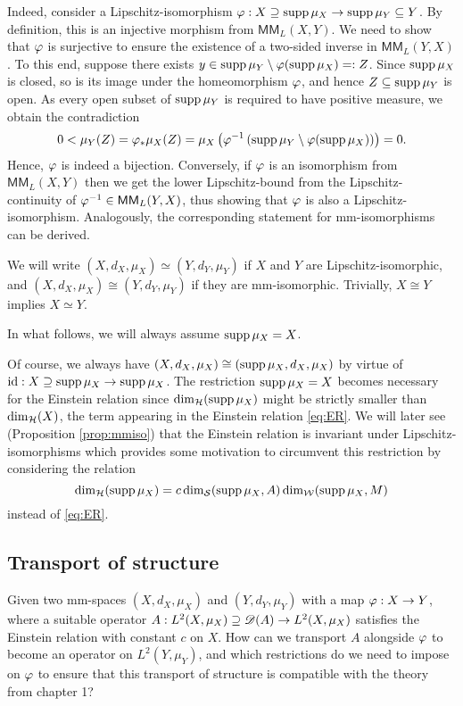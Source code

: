 Indeed, consider a Lipschitz-isomorphism $\varphi:X\supseteq\operatorname{supp}\mu_X\to\operatorname{supp}\mu_Y\subseteq Y$. By definition, this is an injective morphism from $\mathsf{MM}_L(X,Y)$. We need to show that $\varphi$ is surjective to ensure the existence of a two-sided inverse in $\mathsf{MM}_L(Y,X)$. To this end, suppose there exists $y\in\operatorname{supp}\mu_Y\setminus \varphi(\operatorname{supp}\mu_X)=:Z$. Since $\operatorname{supp}\mu_X$ is closed, so is its image under the homeomorphism $\varphi$, and hence $Z\subseteq \operatorname{supp}\mu_Y$ is open. As every open subset of $\operatorname{supp}\mu_Y$ is required to have positive measure, we obtain the contradiction
\[
  0<\mu_Y(Z)=\varphi_*\mu_X(Z)=\mu_X\left(\varphi^{-1}\left(\operatorname{supp}\mu_Y\setminus \varphi(\operatorname{supp}\mu_X)\right)\right)=0.
\]
Hence, $\varphi$ is indeed a bijection. Conversely, if $\varphi$ is an isomorphism from $\mathsf{MM}_L(X,Y)$ then we get the lower Lipschitz-bound from the Lipschitz-continuity of $\varphi^{-1}\in\mathsf{MM}_L(Y,X)$, thus showing that $\varphi$ is also a Lipschitz-isomorphism. Analogously, the corresponding statement for mm-isomorphisms can be derived.

We will write $(X,d_X,\mu_X)\simeq (Y,d_Y,\mu_Y)$ if $X$ and $Y$ are Lipschitz-isomorphic, and 
$(X,d_X,\mu_X)\cong (Y,d_Y,\mu_Y)$ if they are mm-isomorphic. Trivially, $X\cong Y$ implies $X\simeq Y$. 

In what follows, we will always assume $\operatorname{supp}\mu_X=X$.
\begin{rem}
  Of course, we always have $(X,d_X,\mu_X)\cong(\operatorname{supp}\mu_X,d_X,\mu_X)$ by virtue of 
  $\operatorname{id}:X\supseteq\operatorname{supp}\mu_X \to\operatorname{supp}\mu_X$. The restriction $\operatorname{supp}\mu_X=X$ becomes necessary for the Einstein relation since $\dim_{\mathcal{H}}(\operatorname{supp}\mu_X)$ might be strictly smaller than $\dim_{\mathcal{H}}(X)$, the term appearing in the Einstein relation \eqref{eq:ER}. We will later see (Proposition \ref{prop:mmiso}) that the Einstein relation is invariant under Lipschitz-isomorphisms which provides some motivation to circumvent this restriction by considering the relation
  \[
    \dim_{\mathcal{H}}(\operatorname{supp}\mu_X)=c\dim_{\mathcal{S}}(\operatorname{supp}\mu_X,A)\dim_{\mathcal{W}}(\operatorname{supp}\mu_X,M)
  \]
  instead of \eqref{eq:ER}.
\end{rem}

\subsection{Transport of structure}

Given two mm-spaces $(X,d_X,\mu_X)$ and $(Y,d_Y,\mu_Y)$ with a map $\varphi:X\to Y$, where a suitable operator 
$A:L^2(X,\mu_X)\supseteq\mathscr{D}(A)\to L^2(X,\mu_X)$ satisfies the Einstein relation with constant $c$ on $X$. How can we transport $A$ alongside $\varphi$ to become an operator on $L^2(Y,\mu_Y)$, and which restrictions do we need to impose on $\varphi$ to ensure that this transport of structure is compatible with the theory from chapter 1?

